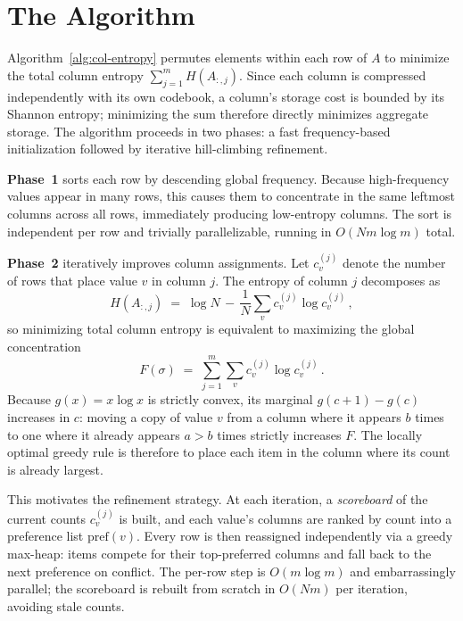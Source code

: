\section{The \alg Algorithm}


Algorithm~\ref{alg:col-entropy} permutes elements within each row of $A$ to
minimize the total column entropy $\sum_{j=1}^{m} H(A_{:,j})$. Since each
column is compressed independently with its own codebook, a column's storage
cost is bounded by its Shannon entropy; minimizing the sum therefore directly
minimizes aggregate storage. The algorithm proceeds in two phases: a fast
frequency-based initialization followed by iterative hill-climbing refinement.

\textbf{Phase~1} sorts each row by descending global frequency. Because
high-frequency values appear in many rows, this causes them to concentrate in
the same leftmost columns across all rows, immediately producing low-entropy
columns. The sort is independent per row and trivially parallelizable, running
in $O(Nm\log m)$ total.

\textbf{Phase~2} iteratively improves column assignments. Let $c_v^{(j)}$
denote the number of rows that place value $v$ in column $j$. The entropy of
column $j$ decomposes as
\begin{equation}\label{eq:entropy-decomp}
  H(A_{:,j}) \;=\; \log N \,-\, \frac{1}{N}\sum_v c_v^{(j)} \log c_v^{(j)}\,,
\end{equation}
so minimizing total column entropy is equivalent to maximizing the global
concentration
\begin{equation}\label{eq:objective}
  F(\sigma) \;=\; \sum_{j=1}^{m} \sum_v c_v^{(j)} \log c_v^{(j)}\,.
\end{equation}
Because $g(x) = x\log x$ is strictly convex, its marginal $g(c+1) - g(c)$
increases in $c$: moving a copy of value $v$ from a column where it appears
$b$ times to one where it already appears $a > b$ times strictly increases
$F$. The locally optimal greedy rule is therefore to place each item in the
column where its count is already largest.

This motivates the refinement strategy. At each iteration, a
\emph{scoreboard} of the current counts $c_v^{(j)}$ is built, and each value's
columns are ranked by count into a preference list $\mathrm{pref}(v)$. Every
row is then reassigned independently via a greedy max-heap: items compete for
their top-preferred columns and fall back to the next preference on conflict.
The per-row step is $O(m\log m)$ and embarrassingly parallel; the scoreboard
is rebuilt from scratch in $O(Nm)$ per iteration, avoiding stale counts.

